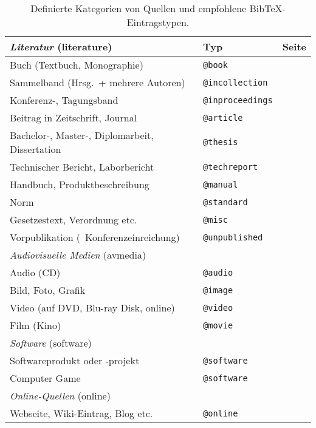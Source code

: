 \begin{table}
\caption{Definierte Kategorien von Quellen und empfohlene BibTeX-Eintragstypen.}
\label{tab:QuellenUndEintragstypen}
\centering
\begin{tabular}{llc}
	\hline
	\emph{Literatur} (\textsf{literature}) & Typ & Seite\\
	\hline
	Buch (Textbuch, Monographie) & \texttt{@book} & \pageref{sec:@book}\\
	Sammelband (Hrsg.\ + mehrere Autoren) & \texttt{@incollection} & \pageref{sec:@incollection} \\
	Konferenz-, Tagungsband & \texttt{@inproceedings} & \pageref{sec:@inproceedings}\\
	Beitrag in Zeitschrift, Journal & \texttt{@article} & \pageref{sec:@article}\\
	Bachelor-, Master-, Diplomarbeit, Dissertation & \texttt{@thesis} & \pageref{sec:@thesis}\\
	Technischer Bericht, Laborbericht & \texttt{@techreport} & \pageref{sec:@techreport}\\
	Handbuch, Produktbeschreibung & \texttt{@manual} & \pageref{sec:@manual}\\
	Norm & \texttt{@standard} & \pageref{sec:@standard}\\
	Gesetzestext, Verordnung etc. & \texttt{@misc} & \pageref{sec:@misc}\\
	Vorpublikation (\zB\ Konferenzeinreichung) & \texttt{@unpublished} & \pageref{sec:@unpublished}\\
%
	\hline
	\emph{Audiovisuelle Medien} (\textsf{avmedia}) & \\
	\hline
	Audio (CD) & \texttt{@audio} & \pageref{sec:@audio}\\
	Bild, Foto, Grafik & \texttt{@image} & \pageref{sec:@image}\\
	Video (auf DVD, Blu-ray Disk, online) & \texttt{@video} & \pageref{sec:@video}\\
	Film (Kino) & \texttt{@movie} & \pageref{sec:@movie}\\
%
	\hline
	\emph{Software} (\textsf{software}) & \\
	\hline
	Softwareprodukt oder -projekt & \texttt{@software} & \pageref{sec:@software}\\
	Computer Game & \texttt{@software} & \pageref{sec:@software}\\
%
	\hline
	\emph{Online-Quellen} (\textsf{online}) & \\
	\hline
	Webseite, Wiki-Eintrag, Blog etc. & \texttt{@online} & \pageref{sec:@online-www}
\end{tabular}
\end{table}


